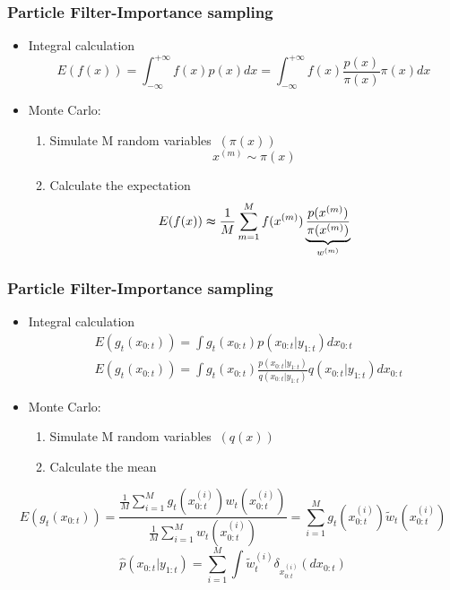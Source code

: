 \documentclass[14pt,hyperref={CJKbookmarks=true}]{beamer}
\theoremstyle{plain}
\theoremstyle{definition}
\theoremstyle{remark}
\begin{document}
\begin{frame}
\small \frametitle{Particle Filter-Importance sampling}
\begin{itemize}
\item Integral calculation
\begin{equation*}
E(f(x)) = \int_{-\infty}^{+\infty}{f(x)p(x)dx}= \int_{-\infty}^{+\infty}{f(x)\frac{p(x)}{\pi (x)}\pi (x)dx}
\end{equation*}
\end{itemize}
\begin{itemize}
\item Monte Carlo:
\begin{enumerate}
\item Simulate M random variables $\:(\pi (x))$
\begin{equation*}
x^{(m)}\sim \pi(x)
\end{equation*}
\item Calculate the expectation
\begin{equation*}
E(f(x))\thickapprox  \frac{1}{M}\sum_{m=1}^{M}{f(x^{(m)}) \underbrace{\frac{p(x^{(m)})}{\pi(x^{(m)})}}_{w^{(m)}}}
\end{equation*}
\end{enumerate}
\end{itemize}
\end{frame}

\begin{frame}
\small \frametitle{Particle Filter-Importance sampling}
\begin{itemize}
\item Integral calculation
\begin{equation*}
\begin{split}
&E(g_t(x_{0:t})) = \int{g_t(x_{0:t})p(x_{0:t}|y_{1:t})dx_{0:t}} \\
&E(g_t(x_{0:t})) = \int{g_t(x_{0:t})\frac {p(x_{0:t}|y_{1:t})}{q(x_{0:t}|y_{1:t})}q(x_{0:t}|y_{1:t})dx_{0:t}}
\end{split}
\end{equation*}
\item Monte Carlo:
\begin{enumerate}
\item Simulate M random variables $\:(q(x))$
\item Calculate the mean
\end{enumerate}
\end{itemize}
\begin{equation*}
E(g_t(x_{0:t}))= \frac{\frac{1}{M}\sum_{i=1}^{M} g_t(x_{0:t}^{(i)})w_t(x_{0:t}^{(i)})}{\frac{1}{M}\sum_{i=1}^{M} w_t(x_{0:t}^{(i)})}=\sum_{i=1}^{M}g_t(x_{0:t}^{(i)})\tilde{w}_t(x_{0:t}^{(i)})
\end{equation*}
\begin{equation*}
\hat{p}(x_{0:t}|y_{1:t})= \sum_{i=1}^{M} \int \tilde{w}_t^{(i)} \delta_{x_{0:t}^{(i)}}(dx_{0:t})
\end{equation*}
\end{frame}
\end{document}
